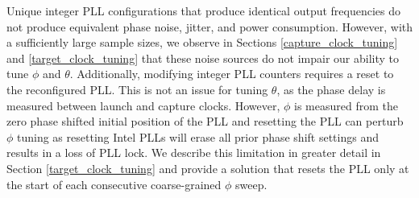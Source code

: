 Unique integer PLL configurations that produce identical output frequencies do not produce equivalent phase noise, jitter, and power consumption. However, with a sufficiently large sample sizes, we observe in Sections \ref{capture_clock_tuning} and \ref{target_clock_tuning} that these noise sources do not impair our ability to tune $\phi$ and $\theta$. Additionally, modifying integer PLL counters requires a reset to the reconfigured PLL. This is not an issue for tuning $\theta$, as the phase delay is measured between launch and capture clocks. However, $\phi$ is measured from the zero phase shifted initial position of the PLL and resetting the PLL can perturb $\phi$ tuning as resetting Intel PLLs will erase all prior phase shift settings and results in a loss of PLL lock. We describe this limitation in greater detail in Section \ref{target_clock_tuning} and provide a solution that resets the PLL only at the start of each consecutive coarse-grained $\phi$ sweep.




